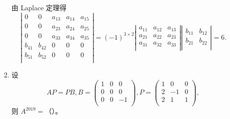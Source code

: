 \begin{enumerate}[1~]
\begin{enumerate}[1.~]
\begin{solution}
由 Laplace 定理得
\[\left| \begin{matrix}
	0&		0&		a_{13}&		a_{14}&		a_{15}\\
	0&		0&		a_{23}&		a_{24}&		a_{25}\\
	0&		0&		a_{33}&		a_{34}&		a_{35}\\
	b_{41}&		b_{42}&		0&		0&		0\\
	b_{51}&		b_{52}&		0&		0&		0\\
\end{matrix} \right|=\left( -1 \right) ^{3\times 2}\left| \begin{matrix}
	a_{11}&		a_{12}&		a_{13}\\
	a_{21}&		a_{22}&		a_{23}\\
	a_{31}&		a_{32}&		a_{33}\\
\end{matrix} \right|\left| \begin{matrix}
	b_{11}&		b_{12}\\
	b_{21}&		b_{22}\\
\end{matrix} \right|=6.
\]
\end{solution}

\item
设 
$$AP=PB, B=\left(\begin{matrix}
	1&		0&		0\\
	0&		0&		0\\
	0&		0&		-1\\
\end{matrix} \right), P=\left( \begin{smallmatrix}
	1&		0&		0\\
	2&		-1&		0\\
	2&		1&		1\\
\end{smallmatrix} \right),
$$
则 $A^{2019}=$（\quad）。


\end{enumerate}
\end{enumerate}

